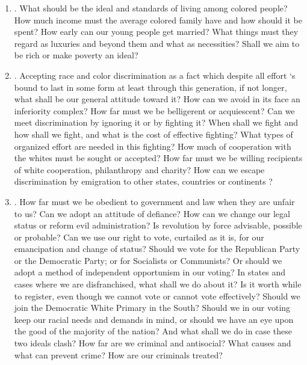 \documentclass[letterpaper,10pt,english]{jupyterBook}
\begin{document}
\begin{enumerate}
\item {} 
\sphinxAtStartPar
{}. What should be the ideal and standards of living among colored people? How much income must the average colored family have and how should it be spent? How early can our young people get married? What things must they regard as luxuries and beyond them and what as necessities? Shall we aim to be rich or make poverty an ideal?

\item {} 
\sphinxAtStartPar
{}. Accepting race and color discrimination as a fact which despite all effort ‘s bound to last in some form at least through this generation, if not longer, what shall be our general attitude toward it? How can we avoid in its face an inferiority complex? How far must we be belligerent or acquiescent? Can we meet discrimination by ignoring it or by fighting it? When shall we fight and how shall we fight, and what is the cost of effective fighting? What types of organized effort are needed in this fighting? How much of co\sphinxhyphen{}operation with the whites must be sought or accepted? How far must we be willing recipients of white co\sphinxhyphen{}operation, philanthropy and charity? How can we escape discrimination by emigration to other states, countries or continents ?

\item {} 
\sphinxAtStartPar
{}. How far must we be obedient to government and law when they are unfair to us? Can we adopt an attitude of defiance? How can we change our legal status or reform evil administration? Is revolution by force advisable, possible or probable? Can we use our right to vote, curtailed as it is, for our emancipation and change of status? Should we vote for the Republican Party or the Democratic Party; or for Socialists or Communists? Or should we adopt a method of independent opportunism in our voting? In states and cases where we are disfranchised, what shall we do about it? Is it worth while to register, even though we cannot vote or cannot vote effectively? Should we join the Democratic White Primary in the South? Should we in our voting keep our racial needs and demands in mind, or should we have an eye upon the good of the majority of the nation? And what shall we do in case these two ideals clash? How far are we criminal and antisocial? What causes and what can prevent crime? How are our criminals treated?


\end{enumerate}
\end{document}
